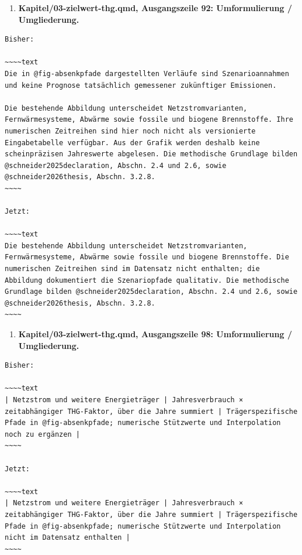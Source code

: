 \documentclass[
  ngerman,
  a4paper,
  DIV=11]{scrreprt}
\providecommand{\tightlist}{%
  \setlength{\itemsep}{0pt}\setlength{\parskip}{0pt}}
\begin{document}
\begin{enumerate}
\def\labelenumi{\arabic{enumi}.}
\setcounter{enumi}{105}
\tightlist
\item
  \textbf{Kapitel/03-zielwert-thg.qmd, Ausgangszeile 92: Umformulierung
  / Umgliederung.}
\end{enumerate}

\begin{verbatim}
Bisher:

~~~~text
Die in @fig-absenkpfade dargestellten Verläufe sind Szenarioannahmen und keine Prognose tatsächlich gemessener zukünftiger Emissionen.

Die bestehende Abbildung unterscheidet Netzstromvarianten, Fernwärmesysteme, Abwärme sowie fossile und biogene Brennstoffe. Ihre numerischen Zeitreihen sind hier noch nicht als versionierte Eingabetabelle verfügbar. Aus der Grafik werden deshalb keine scheinpräzisen Jahreswerte abgelesen. Die methodische Grundlage bilden @schneider2025declaration, Abschn. 2.4 und 2.6, sowie @schneider2026thesis, Abschn. 3.2.8.
~~~~

Jetzt:

~~~~text
Die bestehende Abbildung unterscheidet Netzstromvarianten, Fernwärmesysteme, Abwärme sowie fossile und biogene Brennstoffe. Die numerischen Zeitreihen sind im Datensatz nicht enthalten; die Abbildung dokumentiert die Szenariopfade qualitativ. Die methodische Grundlage bilden @schneider2025declaration, Abschn. 2.4 und 2.6, sowie @schneider2026thesis, Abschn. 3.2.8.
~~~~
\end{verbatim}

\begin{enumerate}
\def\labelenumi{\arabic{enumi}.}
\setcounter{enumi}{106}
\tightlist
\item
  \textbf{Kapitel/03-zielwert-thg.qmd, Ausgangszeile 98: Umformulierung
  / Umgliederung.}
\end{enumerate}

\begin{verbatim}
Bisher:

~~~~text
| Netzstrom und weitere Energieträger | Jahresverbrauch × zeitabhängiger THG-Faktor, über die Jahre summiert | Trägerspezifische Pfade in @fig-absenkpfade; numerische Stützwerte und Interpolation noch zu ergänzen |
~~~~

Jetzt:

~~~~text
| Netzstrom und weitere Energieträger | Jahresverbrauch × zeitabhängiger THG-Faktor, über die Jahre summiert | Trägerspezifische Pfade in @fig-absenkpfade; numerische Stützwerte und Interpolation nicht im Datensatz enthalten |
~~~~
\end{verbatim}
\end{document}
